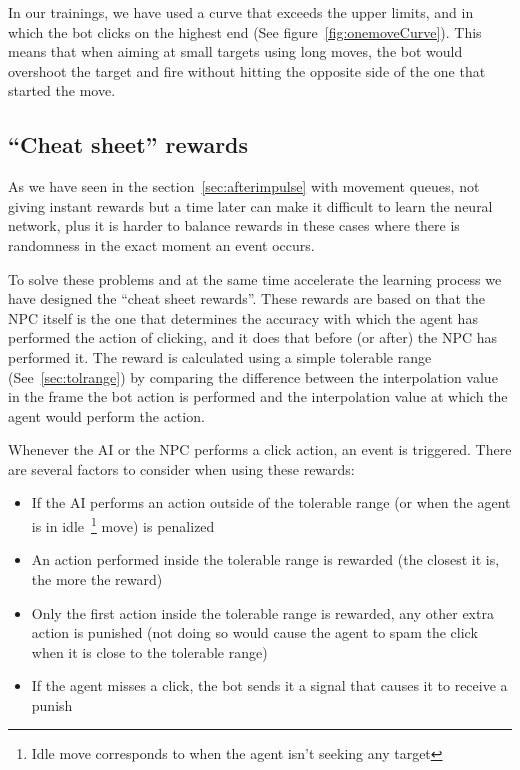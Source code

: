 In our trainings, we have used a curve that exceeds the upper limits, and in which the bot clicks on the highest end (See figure~\ref{fig:onemoveCurve}). This means that when aiming at small targets using long moves, the bot would overshoot the target and fire without hitting the opposite side of the one that started the move.

\subsection{``Cheat sheet'' rewards} %
\label{sec:cheatsheetD}

As we have seen in the section~\ref{sec:afterimpulse} with movement queues, not giving instant rewards but a time later can make it difficult to learn the neural network, plus it is harder to balance rewards in these cases where there is randomness in the exact moment an event occurs.

To solve these problems and at the same time accelerate the learning process we have designed the ``cheat sheet rewards''. These rewards are based on that the NPC itself is the one that determines the accuracy with which the agent has performed the action of clicking, and it does that before (or after) the NPC has performed it. The reward is calculated using a simple tolerable range (See~\ref{sec:tolrange}) by comparing the difference between the interpolation value in the frame the bot action is performed and the interpolation value at which the agent would perform the action.

Whenever the AI or the NPC performs a click action, an event is triggered. There are several factors to consider when using these rewards:
\begin{itemize}
	\item If the AI performs an action outside of the tolerable range (or when the agent is in idle~\footnote{Idle move corresponds to when the agent isn't seeking any target} move) is penalized
	\item An action performed inside the tolerable range is rewarded (the closest it is, the more the reward)
	\item Only the first action inside the tolerable range is rewarded, any other extra action is punished (not doing so would cause the agent to spam the click when it is close to the tolerable range)
	\item If the agent misses a click, the bot sends it a signal that causes it to receive a punish
\end{itemize}

